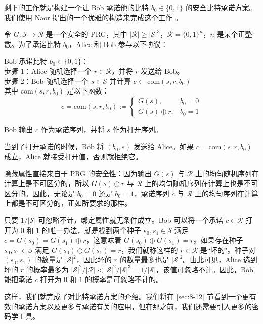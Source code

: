 \begin{snote}[来自安全PRG的比特承诺。]
剩下的工作就是构建一个让 Bob 承诺他的比特 $b_0\in\{0,1\}$ 的安全比特承诺方案。我们使用 Naor 提出的一个优雅的构造来完成这个工作 \cite{}。

令 $G:\mathcal{S}\to\mathcal{R}$ 是一个安全的 PRG，其中 $|\mathcal{R}|\geq|\mathcal{S}|^3$，$\mathcal{R}=\{0,1\}^n$，$n$ 是某个正整数。为了承诺比特 $b_0$，Alice 和 Bob 参与以下协议：

\vspace*{5pt}

\hspace*{5pt} Bob 承诺比特 $b_0\in\{0,1\}$：\\
\hspace*{50pt} 步骤 1：Alice 随机选择一个 $r\in\mathcal{R}$，并将 $r$ 发送给 Bob。\\
\hspace*{50pt} 步骤 2：Bob 随机选择一个 $s\in\mathcal{S}$ 并计算 $c\leftarrow\mathrm{com}(s,r,b_0)$\\
\hspace*{90pt} 其中 $\mathrm{com}(s,r,b_0)$ 是以下函数：\\
\[
c=\mathrm{com}(s,r,b_0):=
\left\{
\begin{array}{ll}
G(s), & b_0=0\\
G(s)\oplus r, & b_0=1
\end{array}	
\right.
\]

\hspace*{5pt} Bob 输出 $c$ 作为承诺序列，并将 $s$ 作为打开序列。

\vspace*{5pt}

\noindent
当到了打开承诺的时候，Bob 将 $(b_0,s)$ 发送给 Alice。如果 $c=\mathrm{com}(s,r,b_0)$ 成立，Alice 就接受打开值，否则就拒绝它。

隐藏属性直接来自于 PRG 的安全性：因为输出 $G(s)$ 与 $\mathcal{R}$ 上的均匀随机序列在计算上是不可区分的，所以 $G(s)\oplus r$ 与 $\mathcal{R}$ 上的均匀随机序列在计算上也是不可区分的。因此，无论是 $b_0=0$ 还是 $b_0=1$，承诺序列 $c$ 与 $\mathcal{R}$ 上的均匀序列在计算上都是不可区分的，正如所要求的那样。

只要 $1/|\mathcal{S}|$ 可忽略不计，绑定属性就无条件成立。Bob 可以将一个承诺 $c\in\mathcal{R}$ 打开为 $0$ 和 $1$ 的唯一办法，就是找到两个种子 $s_0,s_1\in\mathcal{S}$ 满足 $c=G(s_0)=G(s_1)\oplus r$，这意味着 $G(s_0)\oplus G(s_1)=r$。如果存在种子 $s_0,s_1\in\mathcal{S}$ 满足 $G(s_0)\oplus G(s_1)=r$，我们就称这样的 $r\in\mathcal{R}$ 是``坏的"。种子对 $(s_0,s_1)$ 的数量是 $|\mathcal{S}|^2$，因此坏的 $r$ 的数量最多也是 $|\mathcal{S}|^2$。由此可见，Alice 选到坏的 $r$ 的概率最多为 $|\mathcal{S}|^2/|\mathcal{R}| < |\mathcal{S}|^2/|\mathcal{S}|^3 = 1/|\mathcal{S}|$，该值可忽略不计。因此，Bob 能把承诺 $c$ 打开为 $0$ 和 $1$ 的概率是可忽略不计的。
\end{snote}

这样，我们就完成了对比特承诺方案的介绍。我们将在 \ref{sec:8-12} 节看到一个更有效的承诺方案以及更多与承诺有关的应用，但在那之前，我们还需要引入更多的密码学工具。